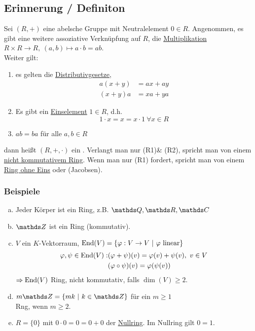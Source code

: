 \subsection{Erinnerung / Definiton}
\label{sub:erinnerung_def}
Sei $(R,+)$ eine abelsche Gruppe mit Neutralelement $0\in R$. Angenommen, es gibt eine weitere assoziative Verknüpfung auf $R$, die \uline{Multiplikation} $R\times R\to R,~ (a,b)\mapsto a\cdot b=ab$.\\
Weiter gilt: 
\begin{enumerate}[(R1)]
	\item es gelten die \uline{Distributivgesetze},
	\begin{equation*}
	\begin{aligned}
		a(x+y)&= ax+ay\\
		(x+y)a&= xa+ya
	\end{aligned}
	\end{equation*}
	\item Es gibt ein \uline{Einselement} $1\in R$, d.h. 
	\[
	1\cdot x=x=x\cdot 1~\forall x\in R
	\]
	\item $ab=ba$ für alle $a,b\in R$
\end{enumerate}
dann heißt $(R,+,\cdot)$ ein . Verlangt man nur (R1)\& (R2), spricht man von einem \uline{nicht kommutativem Ring}. Wenn man nur (R1) fordert, spricht man von einem \uline{Ring ohne Eins} oder  (Jacobsen).

\subsubsection*{Beispiele}
\begin{enumerate}[(a)]
	\item Jeder Körper ist ein Ring, z.B. $\Q,\R,\C$
	\item $\Z$ ist ein Ring (kommutativ).
	\item $V$ ein $K$-Vektorraum, $\operatorname{End}(V)=\{\varphi:V\to V~|~\varphi \text{ linear}\}$\\
	\begin{equation*}
	\begin{aligned}
		\varphi,\psi\in \operatorname{End}(V): &(\varphi+\psi)(v)=\varphi(v)+\psi(v),~v\in V\\
		&(\varphi\circ\psi)(v)=\varphi(\psi(v))
	\end{aligned}
	\end{equation*}
	$\Rightarrow \operatorname{End}(V)$ Ring, nicht kommutativ, falls $\dim(V)\ge 2$.
	\item $m\Z=\{mk~|~k\in \Z \}$ für ein $m\ge 1$\\
	Rng, wenn $m\ge 2$.
	\item $R=\{0\}$ mit $0\cdot 0=0=0+0$ der \uline{Nullring}. Im Nullring gilt $0=1$. 
\end{enumerate}

